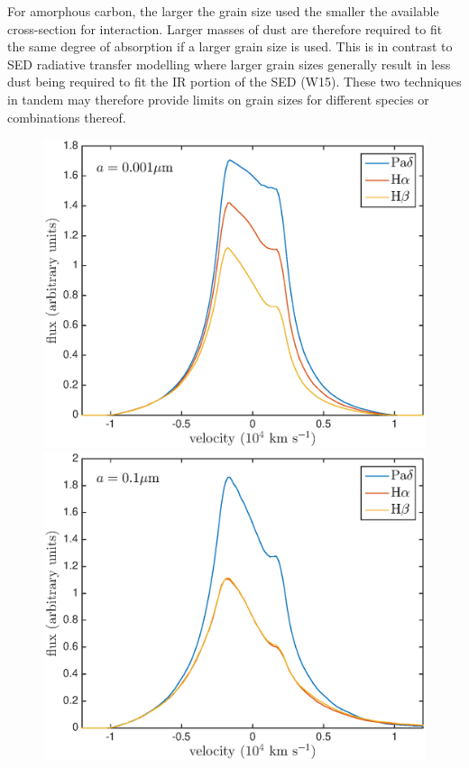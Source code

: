 \documentclass[useAMS,usenatbib,usegraphicx]{mnras}
\begin{document}
For amorphous carbon, the larger the grain size used the smaller the available cross-section for interaction.  Larger masses of dust 
are therefore required to fit the same degree of absorption if a larger 
grain size is used.  This is in contrast to SED radiative transfer 
modelling where larger grain sizes generally result in less dust being 
required to fit the IR portion of the SED (W15).  These two techniques in 
tandem may therefore provide limits on grain sizes for different 
species or combinations thereof.

\begin{figure}
\includegraphics[trim =30 10 45 15,clip=true,scale=0.35]{a0_001_opt_thin_HaHbPad}
\includegraphics[trim =51 10 45 15,clip=true,scale=0.35]{a0_1_opt_thin_HaHbPad}

\end{figure}
\end{document}
